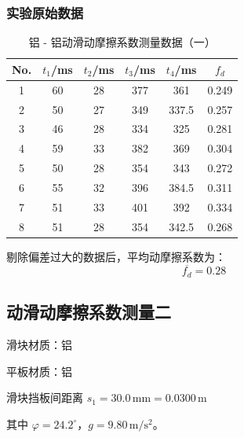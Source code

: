 \subsubsection{实验原始数据}
\begin{table}[h!]
    \centering
    \renewcommand{\arraystretch}{1.5}
    \setlength{\tabcolsep}{8pt}
    \begin{tabular}{|c|c|c|c|c|c|}
    \hline
    \textbf{No.} & $t_1$/ms & $t_2$/ms & $t_3$/ms & $t_4$/ms & $f_d$ \\ \hline
    1 & 60  & 28  & 377 & 361 & 0.249 \\ \hline
    2 & 50  & 27  & 349 & 337.5 & 0.257 \\ \hline
    3 & 46  & 28  & 334 & 325 & 0.281 \\ \hline
    4 & 59  & 33  & 382 & 369 & 0.304 \\ \hline
    5 & 50  & 28  & 354 & 343 & 0.272 \\ \hline
    6 & 55  & 32  & 396 & 384.5 & 0.311 \\ \hline
    7 & 51  & 33  & 401 & 392 & 0.334 \\ \hline
    8 & 51  & 28  & 354 & 342.5 & 0.268 \\ \hline
    \end{tabular}
    \caption{铝 - 铝动滑动摩擦系数测量数据（一）}
    \label{tab:dynamic_friction_data2}
\end{table}

剔除偏差过大的数据后，平均动摩擦系数为：
$$
\overline{f_d} = 0.28
$$

\subsection{动滑动摩擦系数测量二}

滑块材质：铝

平板材质：铝

滑块挡板间距离 $s_1=30.0\,\mathrm{mm}=0.0300\,\mathrm{m}$


其中 $\varphi=24.2^\circ$，$g=9.80\,\mathrm{m/s^2}$。

